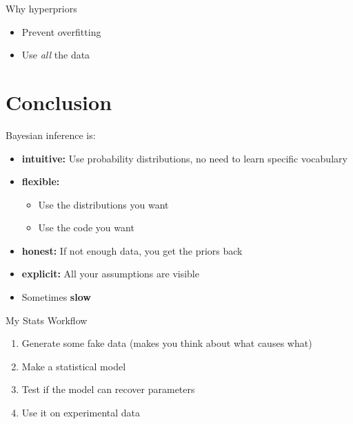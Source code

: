 \documentclass[aspectratio=169,xcolor=svgnames]{beamer}
\begin{document}
\begin{frame}
  \begin{block}{Why hyperpriors}
    \begin{itemize}
    \item Prevent overfitting
    \item Use \emph{all} the data
    \end{itemize}
  \end{block}
\end{frame}

\section{Conclusion}

\begin{frame}
  \begin{block}{Bayesian inference is:}
  \begin{itemize}
  \item \textbf{intuitive:} Use probability distributions, no need to learn specific vocabulary
  \item \textbf{flexible:}
    \begin{itemize}
    \item Use the distributions you want
    \item Use the code you want
    \end{itemize}
  \item \textbf{honest:} If not enough data, you get the priors back
  \item \textbf{explicit:} All your assumptions are visible
  \item<2-> Sometimes \textbf{slow}
  \end{itemize}
  \end{block}
\end{frame}

\begin{frame}
  \begin{block}{My Stats Workflow}
    \begin{enumerate}
    \item Generate some fake data (makes you think about what causes what)
    \item Make a statistical model
    \item Test if the model can recover parameters
    \item Use it on experimental data
    \end{enumerate}
  \end{block}
\end{frame}
\end{document}
